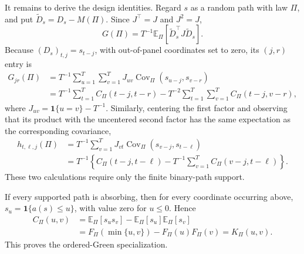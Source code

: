 It remains to derive the design identities.  Regard \(s\) as a random path with law \(\Pi\), and put \(\widetilde D_s=D_s-M(\Pi)\).  Since \(J^{\top}=J\) and \(J^2=J\),
\[
 G(\Pi)=T^{-1}\mathbb E_{\Pi}[\widetilde D_s^{\top}J\widetilde D_s].
\]
Because \((D_s)_{t,j}=s_{t-j}\), with out-of-panel coordinates set to zero, its \((j,r)\) entry is
\[
\begin{aligned}
 G_{jr}(\Pi)
 &=T^{-1}\sum_{u=1}^{T}\sum_{v=1}^{T}J_{uv}
   \operatorname{Cov}_{\Pi}(s_{u-j},s_{v-r})\\
 &=T^{-1}\sum_{t=1}^{T}C_{\Pi}(t-j,t-r)
   -T^{-2}\sum_{t=1}^{T}\sum_{v=1}^{T}C_{\Pi}(t-j,v-r),
\end{aligned}
\]
where \(J_{uv}=\mathbf 1\{u=v\}-T^{-1}\).  Similarly, centering the first factor and observing that its product with the uncentered second factor has the same expectation as the corresponding covariance,
\[
\begin{aligned}
 h_{t,\ell,j}(\Pi)
 &=T^{-1}\sum_{v=1}^{T}J_{vt}
   \operatorname{Cov}_{\Pi}(s_{v-j},s_{t-\ell})\\
 &=T^{-1}\left\{C_{\Pi}(t-j,t-\ell)
   -T^{-1}\sum_{v=1}^{T}C_{\Pi}(v-j,t-\ell)\right\}.
\end{aligned}
\]
These two calculations require only the finite binary-path support.

If every supported path is absorbing, then for every coordinate occurring above,
\(s_u=\mathbf 1\{a(s)\leq u\}\), with value zero for \(u\leq0\).  Hence
\[
\begin{aligned}
 C_{\Pi}(u,v)
 &=\mathbb E_{\Pi}[s_us_v]-\mathbb E_{\Pi}[s_u]\mathbb E_{\Pi}[s_v]\\
 &=F_{\Pi}(\min\{u,v\})-F_{\Pi}(u)F_{\Pi}(v)
 =K_{\Pi}(u,v).
\end{aligned}
\]
This proves the ordered-Green specialization.


